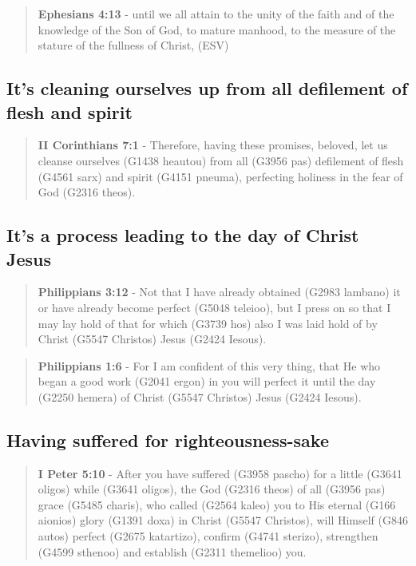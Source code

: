 \documentclass[11pt]{article}
\begin{document}
\begin{quote}
\textbf{Ephesians 4:13} - until we all attain to the unity of the faith and of the knowledge of the Son of God, to mature manhood, to the measure of the stature of the fullness of Christ, (ESV)
\end{quote}

\subsection{It's cleaning ourselves up from all defilement of flesh and spirit}
\label{sec:orgad5eef2}
\begin{quote}
\textbf{II Corinthians 7:1} - Therefore, having these promises, beloved, let us cleanse ourselves (G1438 heautou) from all (G3956 pas) defilement of flesh (G4561 sarx) and spirit (G4151 pneuma), perfecting holiness in the fear of God (G2316 theos).
\end{quote}

\subsection{It's a process leading to the day of Christ Jesus}
\label{sec:org91524b9}
\begin{quote}
\textbf{Philippians 3:12} - Not that I have already obtained (G2983 lambano) it or have already become perfect (G5048 teleioo), but I press on so that I may lay hold of that for which (G3739 hos) also I was laid hold of by Christ (G5547 Christos) Jesus (G2424 Iesous).
\end{quote}

\begin{quote}
\textbf{Philippians 1:6} - For I am confident of this very thing, that He who began a good work (G2041 ergon) in you will perfect it until the day (G2250 hemera) of Christ (G5547 Christos) Jesus (G2424 Iesous).
\end{quote}

\subsection{Having suffered for righteousness-sake}
\label{sec:orgc5b1920}
\begin{quote}
\textbf{I Peter 5:10} - After you have suffered (G3958 pascho) for a little (G3641 oligos) while (G3641 oligos), the God (G2316 theos) of all (G3956 pas) grace (G5485 charis), who called (G2564 kaleo) you to His eternal (G166 aionios) glory (G1391 doxa) in Christ (G5547 Christos), will Himself (G846 autos) perfect (G2675 katartizo), confirm (G4741 sterizo), strengthen (G4599 sthenoo) and establish (G2311 themelioo) you.
\end{quote}
\end{document}

